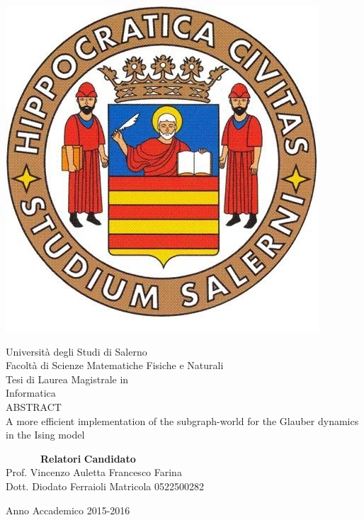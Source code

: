 \documentclass[11pt,oneside]{book}
\theoremstyle{plain}
\begin{document}

\begin{titlepage}
\begin{center}
\begin{center}
\includegraphics[scale=0.28, natwidth=793, natheight=1123]{img/logounisa.jpg}
\end{center}
{\Large Universit\`a degli Studi di Salerno}\\[0.2truecm]
{\large Facolt\`a di Scienze Matematiche Fisiche e Naturali}\\
\hrulefill
\vfill
{\large Tesi di Laurea Magistrale in}\\[0.2truecm]
{\Large Informatica}\\
\vfill\vfill
{\Huge ABSTRACT\\A more efficient implementation of the subgraph-world for the Glauber dynamics in the Ising model}
\vfill\vfill


\ \ \ \ \ \ \ {\bf Relatori} \hfill {\bf Candidato}\ \ \\
Prof. Vincenzo Auletta \hfill Francesco Farina\\
Dott. Diodato Ferraioli \hfill Matricola 0522500282

\vfill
\hrulefill

Anno Accademico 2015-2016

\end{center}
\end{titlepage}
\end{document}
